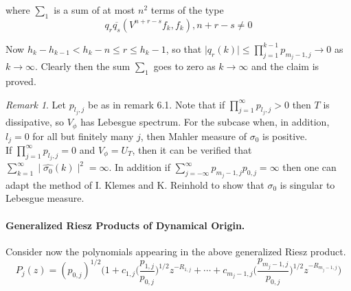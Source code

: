 \documentclass{amsart}
\theoremstyle{definition}
\theoremstyle{remark}
\newtheorem{rem}[Th]{Remark}
\numberwithin{equation}{section}
\newcommand{\1}{\mathbb{1}}
\begin{document}
where $\sum_1$ is a sum of at most $n^2$ terms of the type
$$q_r{\overline{q_s}}(V^{n+r-s}f_k,f_k) , n+r-s \neq 0$$

Now $h_k - h_{k-1} < h_k-n \leq r \leq h_k-1$, so that $\mid q_r(k)\mid \leq \prod_{j=1}^{k-1}p_{m_{j}-1, j} \rightarrow 0$ as $k\rightarrow \infty$. Clearly then the sum $\sum_1$ goes to zero as $k\rightarrow \infty$ and the claim is proved.\\

\begin{rem}\label{rem2} Let $p_{l_j,j}$ be as in remark 6.1. Note  that if $\prod_{j=1}^\infty p_{l_j,j} > 0$ then $T$ is dissipative, so $V_\phi$ has Lebesgue spectrum. For the subcase  when, in addition,
$l_j= 0$ for all but finitely many $j$, then Mahler measure of $\sigma_0$ is positive.\\

If $\prod_{j=1}^\infty p_{l_j,j} =0$ and $V_\phi = U_T$, then it can be verified that $\sum_{k=1}^\infty\mid \hat{\sigma_0}(k)\mid^2 = \infty$. In addition if $\sum_{j=-\infty}^\infty p_{m_j-1,j}p_{0,j} = \infty$ then one  can adapt the method of I. Klemes and K. Reinhold \cite {KlemesR} to show that $\sigma_0$ is singular to Lebesgue measure.\\
\end{rem}


\paragraph{\textbf{Generalized Riesz Products of Dynamical Origin.}}
Consider now the polynomials appearing in the above generalized Riesz product.
$$P_j(z) = (p_{0,j})^{1/2}\Bigg(1 + c_{1,j}\Big(\frac{p_{1,j}}{p_{0,j}}\Big)^{1/2}z^{-R_{1,j}} + \cdots + c_{m_j-1,j}\Big(\frac{p_{m_j-1,j}}{p_{0,j}}\Big)^{1/2}z^{-R_{m_j-1,j}}\Bigg)$$
\end{document}
